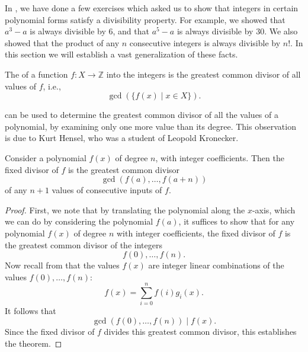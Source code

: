 In , we have done a few exercises which asked us to show that integers in certain polynomial forms satisfy a divisibility property. For example, we showed that $a^3-a$ is always divisible by $6$, and that $a^5-a$ is always divisible by $30$. We also showed that the product of any $n$ consecutive integers is always divisible by $n!$. In this section we will establish a vast generalization of these facts.

\begin{definition}\label{definition:fixed-divisor}
  The  of a function $f:X\to \mathbb{Z}$ into the integers is the greatest common divisor of all values of $f$, i.e.,
  \begin{equation*}
    \gcd(\{f(x)\mid x\in X\}).
  \end{equation*}
\end{definition}

 can be used to determine the greatest common divisor of all the values of a polynomial, by examining only one more value than its degree. This observation is due to Kurt Hensel, who was a student of Leopold Kronecker.

\begin{theorem}\label{theorem:hensels-fixed-divisor-theorem}
  Consider a polynomial $f(x)$ of degree $n$, with integer coefficients. Then the fixed divisor of $f$ is the greatest common divisor
  \begin{equation*}
    \gcd(f(a),\ldots,f(a+n))
  \end{equation*}
  of any $n+1$ values of consecutive inputs of $f$.
\end{theorem}

\begin{proof}
  First, we note that by translating the polynomial along the $x$-axis, which we can do by considering the polynomial $f(a)$, it suffices to show that for any polynomial $f(x)$ of degree $n$ with integer coefficients, the fixed divisor of $f$ is the greatest common divisor of the integers
  \begin{equation*}
    f(0),\ldots,f(n).
  \end{equation*}
  Now recall from  that the values $f(x)$ are integer linear combinations of the values $f(0),\ldots,f(n)$:
  \begin{equation*}
    f(x)=\sum_{i=0}^nf(i)g_i(x).
  \end{equation*}
  It follows that
  \begin{equation*}
    \gcd(f(0),\ldots,f(n))\mid f(x).
  \end{equation*}
  Since the fixed divisor of $f$ divides this greatest common divisor, this establishes the theorem.
\end{proof}

